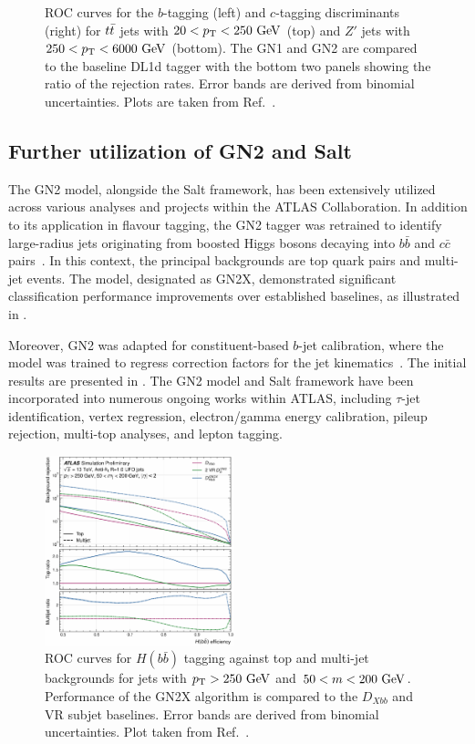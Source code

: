 \begin{figure}[ht]
    \caption{ROC curves for the $b$-tagging (left) and $c$-tagging discriminants (right) for $t\bar{t}$ jets with $20 < \pt < 250~\GeV$ (top) and $Z'$ jets with $250 < \pt < 6000~\GeV$ (bottom). The GN1 and GN2 are compared to the baseline DL1d tagger with the bottom two panels showing the ratio of the rejection rates. Error bands are derived from binomial uncertainties. Plots are taken from Ref.~\cite{GN2Plots}.}
    \label{fig:gn2}
\end{figure}

\subsection{Further utilization of GN2 and Salt}

The GN2 model, alongside the Salt framework, has been extensively utilized across various analyses and projects within the ATLAS Collaboration.
In addition to its application in flavour tagging, the GN2 tagger was retrained to identify large-radius jets originating from boosted Higgs bosons decaying into $b\bar{b}$ and $c\bar{c}$ pairs~\cite{GN2X}.
In this context, the principal backgrounds are top quark pairs and multi-jet events.
The model, designated as GN2X, demonstrated significant classification performance improvements over established baselines, as illustrated in .

Moreover, GN2 was adapted for constituent-based $b$-jet calibration, where the model was trained to regress correction factors for the jet kinematics~\cite{GN2Calib}.
The initial results are presented in .
The GN2 model and Salt framework have been incorporated into numerous ongoing works within ATLAS, including $\tau$-jet identification, vertex regression, electron/gamma energy calibration, pileup rejection, multi-top analyses, and lepton tagging.

\begin{figure}
    \centering
    \includegraphics[width=0.49\textwidth]{figures/flavour_tagging/gn2x.pdf}
    \caption{ROC curves for $H(b\bar{b})$ tagging against top and multi-jet backgrounds for jets with $\pt>250~\GeV$ and $50<m<200~\GeV$. Performance of the GN2X algorithm is compared to the $D_{Xbb}$ and VR subjet baselines. Error bands are derived from binomial uncertainties. Plot taken from Ref.~\cite{GN2X}.}
    \label{fig:gn2x}
\end{figure}

